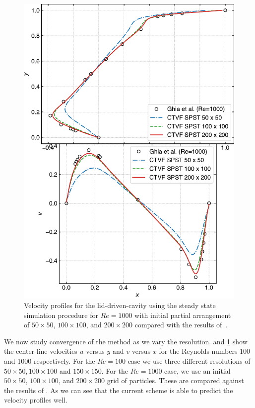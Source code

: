 \documentclass[preprint,12pt]{elsarticle}
\begin{document}
\begin{figure}[!htpb]
  \centering
  \includegraphics[width=1\linewidth]{fig_15}
  \caption{Velocity profiles for the lid-driven-cavity using the steady state
    simulation procedure for $Re = 1000$ with initial partial arrangement of
    $50 \times 50$, $100 \times 100$, and $200 \times 200$ compared with
    the results of~\cite{ldc:ghia-1982}.}%
\label{fig:ldc:uv_re1000}
\end{figure}

We now study convergence of the method as we vary the
resolution.  and \cref{fig:ldc:uv_re1000} show the
center-line velocities $u$ versus $y$ and $v$ versus $x$ for the Reynolds
numbers 100 and 1000 respectively. For the $Re=100$ case we use three
different resolutions of $50\times 50, 100 \times 100$ and $150 \times
150$. For the $Re=1000$ case, we use an initial $50 \times 50$,
$100 \times 100$, and $200 \times 200$ grid of particles. These are compared
against the results of \cite{ldc:ghia-1982}. As we can see that the current
scheme is able to predict the velocity profiles well.
\end{document}
